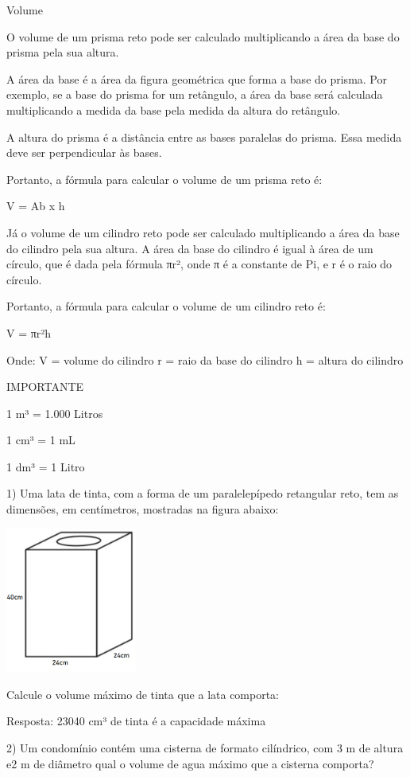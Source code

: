 Volume

O volume de um prisma reto pode ser calculado multiplicando a área da
base do prisma pela sua altura.

A área da base é a área da figura geométrica que forma a base do prisma.
Por exemplo, se a base do prisma for um retângulo, a área da base será
calculada multiplicando a medida da base pela medida da altura do
retângulo.

A altura do prisma é a distância entre as bases paralelas do prisma.
Essa medida deve ser perpendicular às bases.

Portanto, a fórmula para calcular o volume de um prisma reto é:

V = Ab x h

Já o volume de um cilindro reto pode ser calculado multiplicando a área
da base do cilindro pela sua altura. A área da base do cilindro é igual
à área de um círculo, que é dada pela fórmula πr², onde π é a constante
de Pi, e r é o raio do círculo.

Portanto, a fórmula para calcular o volume de um cilindro reto é:

V = πr²h

Onde: V = volume do cilindro r = raio da base do cilindro h = altura do
cilindro

IMPORTANTE

1 m³ = 1.000 Litros

1 cm³ = 1 mL

1 dm³ = 1 Litro


1) Uma lata de tinta, com a forma de um paralelepípedo retangular reto,
tem as dimensões, em centímetros, mostradas na figura abaixo:

\includegraphics[width=1.69792in,height=1.88115in]{./imgSAEB_6_MAT/media/image95.png}

Calcule o volume máximo de tinta que a lata comporta:

Resposta: 23040 cm³ de tinta é a capacidade máxima

2) Um condomínio contém uma cisterna de formato cilíndrico, com 3 m de
altura e2 m de diâmetro qual o volume de agua máximo que a cisterna
comporta?

